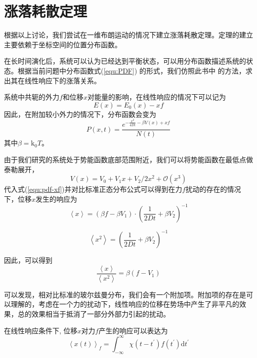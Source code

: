 \section{涨落耗散定理}
根据以上讨论，我们尝试在一维布朗运动的情况下建立涨落耗散定理。定理的建立主要依赖于坐标空间的位置分布函数。

在长时间演化后，系统可以认为已经达到平衡状态，可以用分布函数描述系统的状态。根据当前问题中分布函数式(\ref{equ:PDF})
的形式，我们仿照此书\cite{zhaoTongJiReWuLiXue2019}中
的方法，求出其在线性响应下的涨落关系。

系统中共轭的外力$f$和位移$x$对能量的影响，在线性响应的情况下可以记为
\begin{equation}
    E(x)=E_0(x)-xf
\end{equation}
因此，在附加较小外力的情况下，分布函数会变为
\begin{equation}
    P(x, t) =\frac{e^{-\frac{x^{2}}{4 D t}-\beta V(x)+xf}}{N(t)}
    \label{equ:pdf-xf}
\end{equation}
其中$\beta=\mathrm{k}_{0} T$。

由于我们研究的系统处于势能函数底部范围附近，我们可以将势能函数在最低点做泰勒展开，
\begin{equation}
    V(x)=V_0+V_1 x+V_2/2 x^2 + \mathcal{O}(x^3)
\end{equation}
代入式(\ref{equ:pdf-xf})并对比标准正态分布公式可以得到在力$f$扰动的存在的情况下，位移$x$发生的响应为
\begin{equation}
    \left\langle x \right\rangle = (\beta f - \beta V_1)\cdot\left( \frac{1}{2Dt} + \beta V_2\right)^{-1}
    \label{equ:ang-x}
\end{equation}

\begin{equation}
    \left\langle x^2 \right\rangle = \left( \frac{1}{2Dt} + \beta V_2\right)^{-1}
\end{equation}

因此，可以得到
\begin{equation}
    \frac{\left\langle x \right\rangle}{\left\langle x^2 \right\rangle} = \beta (f - V_1)
    \label{equ:ang-x-x2}
\end{equation}

可以发现，相对比标准的玻尔兹曼分布，我们会有一个附加项。附加项的存在是可以理解的，考虑在一个力的扰动下，线性响应的位移在势场中产生了非平凡的效果，总的效果相当于抵消了一部分外部力引起的扰动。

在线性响应条件下, 位移$x$对力$f$产生的响应可以表达为
$$
\left\langle x(t) \right\rangle_{f}=\int_{-\infty}^{\infty} \chi\left(t-t^{\prime}\right) f\left(t^{\prime}\right) \mathrm{d} t^{\prime}
$$

